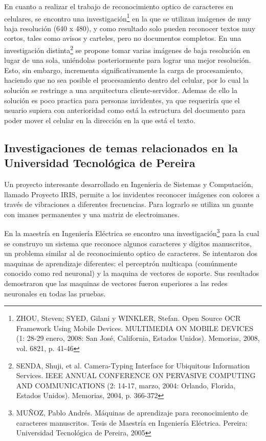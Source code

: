 \documentclass[a4paper, 11pt, oneside]{report}
\begin{document}
En cuanto a realizar el trabajo de reconocimiento optico de caracteres en celulares, se encontro una investigación\footnote{ZHOU, Steven; SYED, Gilani y WINKLER, Stefan. Open Source OCR Framework Using Mobile Devices. MULTIMEDIA ON MOBILE DEVICES (1: 28-29 enero, 2008: San José, California, Estados Unidos). Memorias, 2008, vol. 6821, p. 41-46} en la que se utilizan imágenes de muy baja resolución (640 x 480), y como resultado solo pueden reconocer textos muy cortos, tales como avisos y carteles, pero no documentos completos. En una investigación distinta\footnote{SENDA, Shuji, et al. Camera-Typing Interface for Ubiquitous Information Services. IEEE ANNUAL CONFERENCE ON PERVASIVE COMPUTING AND COMMUNICATIONS (2: 14-17, marzo, 2004: Orlando, Florida, Estados Unidos). Memorias, 2004, p. 366-372} se propone tomar varias imágenes de baja resolución en lugar de una sola, uniéndolas posteriormente para lograr una mejor resolución. Esto, sin embargo, incrementa significativamente la carga de procesamiento, haciendo que no sea posible el procesamiento dentro del celular, por lo cual la solución se restringe a una arquitectura cliente-servidor. Ademas de ello la solución es poco practica para personas invidentes, ya que requeriría que el usuario supiera con anterioridad como está la estructura del documento para poder mover el celular en la dirección en la que está el texto.
	
\subsection{Investigaciones de temas relacionados en la Universidad Tecnológica de Pereira}

Un proyecto interesante desarrollado en Ingenieria de Sistemas y Computación, llamado Proyecto IRIS, permite a los invidentes reconocer imágenes con colores a través de vibraciones a diferentes frecuencias. Para lograrlo se utiliza un guante con imanes permanentes y una matriz de electroimanes.

En la maestría en Ingeniería Eléctrica se encontro una investigación\footnote{MUÑOZ, Pablo Andrés. Máquinas de aprendizaje para reconocimiento de caracteres manuscritos. Tesis de Maestría en Ingeniería Eléctrica. Pereira: Universidad Tecnológica de Pereira, 2005} para la cual se construyo un sistema que reconoce algunos caracteres y dígitos manuscritos, un problema similar al de reconocimiento optico de caracteres. Se intentaron dos maquinas de aprendizaje diferentes: el perceptrón multicapa (comúnmente conocido como red neuronal) y la maquina de vectores de soporte. Sus resultados demostraron que las maquinas de vectores fueron superiores a las redes neuronales en todas las pruebas.
    
\end{document}
